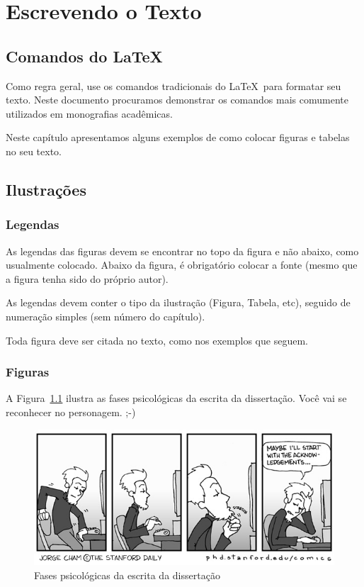 \documentclass[twoside,english,brazilian]{UNISINOSmonografia}
\begin{document}
\chapter{Escrevendo o Texto}

\section{Comandos do \LaTeX}
Como regra geral, use os comandos tradicionais do \LaTeX\ para formatar seu texto.  Neste documento procuramos demonstrar os comandos mais comumente utilizados em monografias acadêmicas.

Neste capítulo apresentamos alguns exemplos de como colocar figuras e tabelas no seu texto.

\section{Ilustrações}

\subsection{Legendas}
As legendas das figuras devem se encontrar no topo da figura e não abaixo, como usualmente colocado. Abaixo da figura, é obrigatório colocar a fonte (mesmo que a figura tenha sido do próprio autor).

As legendas devem conter o tipo da ilustração (Figura, Tabela, etc), seguido de numeração simples (sem número do capítulo).

Toda figura deve ser citada no texto, como nos exemplos que seguem.

\subsection{Figuras}
A Figura~\ref{fig:escrita} ilustra as fases psicológicas da escrita da dissertação. Você vai se reconhecer no personagem. ;-)

\begin{figure}
	\caption{Fases psicológicas da escrita da dissertação}
	\label{fig:escrita}
	\centering%
	\begin{minipage}{.8\textwidth}
		\includegraphics[width=\textwidth]{escrita}
	\end{minipage}
\end{figure}
\end{document}
